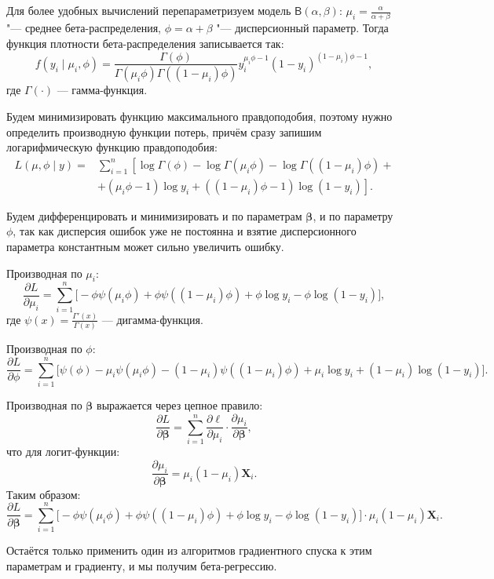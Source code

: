 \documentclass[12pt]{article}
\begin{document}
	Для более удобных вычислений перепараметризуем модель $\mathsf{B}(\alpha, \beta)$: $\mu _i = \frac{\alpha} {\alpha + \beta}$ "--- среднее бета-распределения, $\phi = \alpha + \beta$ "--- дисперсионный параметр. 
	Тогда функция плотности бета-распределения записывается так:
	\[
	f(y_i \mid \mu_i, \phi) = \frac{\Gamma(\phi)}{\Gamma(\mu_i \phi) \Gamma((1 - \mu_i) \phi)} y_i^{\mu_i \phi - 1} (1 - y_i)^{(1 - \mu_i) \phi - 1},
	\]
	где $ \Gamma(\cdot) $ — гамма-функция.
	
	Будем минимизировать функцию максимального правдоподобия, поэтому нужно определить производную функции потерь, причём сразу запишим логарифмическую функцию правдоподобия:
	\[
	\begin{aligned}
	L(\mu, \phi \mid y) =& \sum_{i=1}^n \left[ \log \Gamma(\phi) - \log \Gamma(\mu_i \phi) - \log \Gamma((1 - \mu_i) \phi) +\right.\\
	&\left.+(\mu_i \phi - 1) \log y_i + ((1 - \mu_i) \phi - 1) \log (1 - y_i) \right].
	\end{aligned}
	\]
	
	Будем дифференцировать и минимизировать и по параметрам $\boldsymbol{\beta}$, и по параметру $\phi$, так как дисперсия ошибок уже не постоянна и взятие дисперсионного параметра константным может сильно увеличить ошибку.
	
	Производная по $ \mu_i $:
	\[
	\frac{\partial L}{\partial \mu_i} = \sum_{i=1}^n \Bigg[ -\phi \psi(\mu_i \phi) + \phi \psi((1 - \mu_i) \phi) + \phi \log y_i - \phi \log (1 - y_i) \Bigg],
	\]
	где $ \psi(x) = \frac{\Gamma'(x)}{\Gamma(x)} $ — дигамма-функция.
	
	Производная по $ \phi $:
	\[
	\frac{\partial L}{\partial \phi} = \sum_{i=1}^n \Bigg[ \psi(\phi) - \mu_i \psi(\mu_i \phi) - (1 - \mu_i) \psi((1 - \mu_i) \phi) + \mu_i \log y_i + (1 - \mu_i) \log (1 - y_i) \Bigg].
	\]
	
	Производная по $ \boldsymbol{\beta} $ выражается через цепное правило:
	\[
	\frac{\partial L}{\partial \boldsymbol{\beta}} = \sum_{i=1}^n \frac{\partial \ell}{\partial \mu_i} \cdot \frac{\partial \mu_i}{\partial \boldsymbol{\beta}},
	\]
	что для логит-функции:
	\[
	\frac{\partial \mu_i}{\partial \boldsymbol{\beta}} = \mu_i (1 - \mu_i) \mathbf{X}_i.
	\]
	Таким образом:
	\[
	\frac{\partial L}{\partial \boldsymbol{\beta}} = \sum_{i=1}^n \Bigg[ -\phi \psi(\mu_i \phi) + \phi \psi((1 - \mu_i) \phi) + \phi \log y_i - \phi \log (1 - y_i) \Bigg] \cdot \mu_i (1 - \mu_i) \mathbf{X}_i.
	\]
	
	Остаётся только применить один из алгоритмов градиентного спуска к этим параметрам и градиенту, и мы получим бета-регрессию.
	
\end{document}
